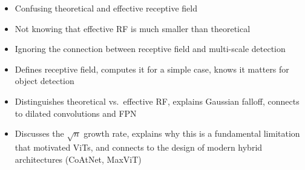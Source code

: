 \begin{interviewq}
\redflags
\begin{itemize}
    \item Confusing theoretical and effective receptive field
    \item Not knowing that effective RF is much smaller than theoretical
    \item Ignoring the connection between receptive field and multi-scale detection
\end{itemize}


\goodgreat
\begin{itemize}
    \item {} Defines receptive field, computes it for a simple case, knows it matters for object detection
    \item {} Distinguishes theoretical vs.\ effective RF, explains Gaussian falloff, connects to dilated convolutions and FPN
    \item {} Discusses the $\sqrt{n}$ growth rate, explains why this is a fundamental limitation that motivated ViTs, and connects to the design of modern hybrid architectures (CoAtNet, MaxViT)
\end{itemize}

\end{interviewq}

